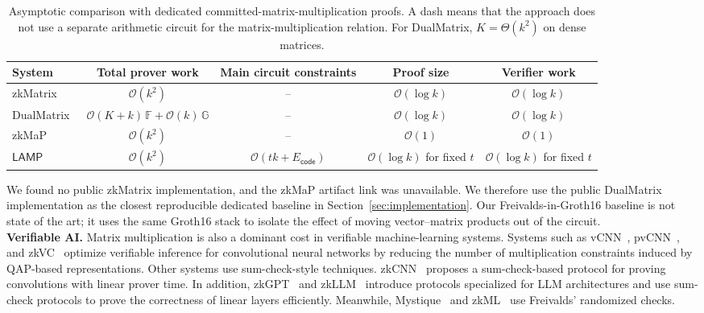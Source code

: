 \documentclass[conference,compsoc]{IEEEtran}
\newcommand{\protocol}{\textsf{LAMP}}   %
\theoremstyle{plain}
\theoremstyle{definition}
\theoremstyle{remark}
\providecommand{\DIFaddtex}[1]{{\protect\color{DIFADD} \sf #1}} %
\providecommand{\DIFaddbegin}{} %
\providecommand{\DIFaddend}{} %
\providecommand{\DIFaddFL}[1]{\DIFadd{#1}} %
\providecommand{\DIFaddendFL}{} %
\providecommand{\DIFadd}[1]{\texorpdfstring{\DIFaddtex{#1}}{#1}} %
\providecommand{\DIFaddincludegraphics}[2][]{{\color{blue}\fbox{\DIFOincludegraphics[#1]{#2}}}} %
\DeclareRobustCommand{\DIFaddbegin}{\DIFOaddbegin \let\includegraphics\DIFaddincludegraphics} %
\DeclareRobustCommand{\DIFaddend}{\DIFOaddend \let\includegraphics\DIFOincludegraphics} %
\DeclareRobustCommand{\DIFaddendFL}{\DIFOaddendFL \let\includegraphics\DIFOincludegraphics} %
\begin{document}
\begin{table}[t]
\centering
\footnotesize
\begin{adjustbox}{max width=\textwidth}
\begin{tabular}{lcccc}
\toprule
\DIFaddFL{\textbf{System} }& \DIFaddFL{\textbf{Total prover work} }& \DIFaddFL{\textbf{Main circuit constraints}
}& \DIFaddFL{\textbf{Proof size} }& \DIFaddFL{\textbf{Verifier work} }\DIFaddendFL \\
\midrule
\DIFaddFL{zkMatrix~\cite{cong2024zkmatrix}
}& \DIFaddFL{\(\mathcal{O}(k^2)\) }& \DIFaddFL{-- }& \DIFaddFL{\(\mathcal{O}(\log k)\)
}& \DIFaddFL{\(\mathcal{O}(\log k)\) }\\
\DIFaddFL{DualMatrix~\cite{cong2026dualmatrix}
}& \DIFaddFL{\(\mathcal{O}(K+k)\,\mathbb{F}+\mathcal{O}(k)\,\mathbb{G}\) }& \DIFaddFL{--
}& \DIFaddFL{\(\mathcal{O}(\log k)\) }& \DIFaddFL{\(\mathcal{O}(\log k)\) }\\
\DIFaddFL{zkMaP~\cite{zkMaP}
}& \DIFaddFL{\(\mathcal{O}(k^2)\) }& \DIFaddFL{-- }& \DIFaddFL{\(\mathcal{O}(1)\)
}& \DIFaddFL{\(\mathcal{O}(1)\) }\\
\DIFaddFL{\(\protocol\)
}& \DIFaddFL{\(\mathcal{O}(k^2)\)
}& \DIFaddFL{\(\mathcal{O}(tk+E_{\mathsf{code}})\)
}& \DIFaddFL{\(\mathcal{O}(\log k)\) for fixed \(t\)
}& \DIFaddFL{\(\mathcal{O}(\log k)\) for fixed \(t\) }\\
\bottomrule
\end{tabular}
\end{adjustbox}
\vspace{4pt}
\caption{\DIFaddFL{Asymptotic comparison with dedicated committed-matrix-multiplication
proofs. A dash means that the approach does not use a separate arithmetic
circuit for the matrix-multiplication relation. For DualMatrix,
\(K=\Theta(k^2)\) on dense matrices.}}
\label{tab:related-matrix-comparison}
\end{table}
\DIFaddend 

\DIFaddbegin \DIFadd{We found no public zkMatrix implementation, and the zkMaP artifact link was
unavailable. We therefore use the public DualMatrix implementation as the
closest reproducible dedicated baseline in Section~\ref{sec:implementation}.
Our Freivalds-in-Groth16 baseline is not state of the art; it uses the same
Groth16 stack to isolate the effect of moving vector--matrix products out of
the circuit. }\\

\DIFaddend \noindent\textbf{Verifiable AI.}
Matrix multiplication is also a dominant cost in verifiable machine-learning
systems. Systems such as vCNN~\cite{lee2024vcnn}, pvCNN~\cite{pvCNN}, and
zkVC~\cite{zhang2025zkvc} optimize verifiable inference for convolutional neural
networks by reducing the number of multiplication constraints induced by
QAP-based representations. Other systems use sum-check-style techniques.
zkCNN~\cite{liu2021zkcnn} proposes a sum-check-based protocol for proving
convolutions with linear prover time. In addition, zkGPT~\cite{zkGPT} and
zkLLM~\cite{zkLLM} introduce protocols specialized for LLM architectures and
use sum-check protocols to prove the correctness of linear layers efficiently.
Meanwhile, Mystique~\cite{weng2021mystique} and zkML~\cite{chen2024zkml} use
Freivalds' randomized checks. \\
\end{document}
